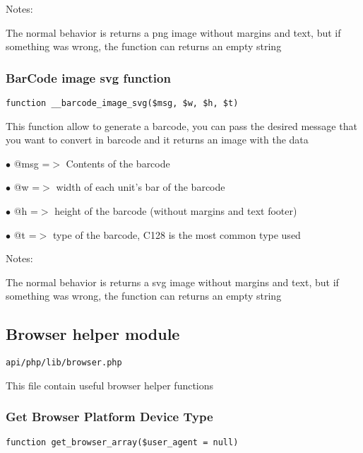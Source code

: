 \documentclass[a4paper]{article}
\begin{document}
Notes:

The normal behavior is returns a png image without margins and text,
but if something was wrong, the function can returns an empty string

\hypertarget{toc388}{}
\subsubsection{BarCode image svg function}

\begin{lstlisting}
function __barcode_image_svg($msg, $w, $h, $t)
\end{lstlisting}

This function allow to generate a barcode, you can pass the desired
message that you want to convert in barcode and it returns an image
with the data

\begin{compactitem}
\item[\color{myblue}$\bullet$] @msg =$>$ Contents of the barcode
\item[\color{myblue}$\bullet$] @w   =$>$ width of each unit's bar of the barcode
\item[\color{myblue}$\bullet$] @h   =$>$ height of the barcode (without margins and text footer)
\item[\color{myblue}$\bullet$] @t   =$>$ type of the barcode, C128 is the most common type used
\end{compactitem}

Notes:

The normal behavior is returns a svg image without margins and text,
but if something was wrong, the function can returns an empty string

\hypertarget{toc389}{}
\subsection{Browser helper module}

\begin{lstlisting}
api/php/lib/browser.php
\end{lstlisting}

This file contain useful browser helper functions

\hypertarget{toc390}{}
\subsubsection{Get Browser Platform Device Type}

\begin{lstlisting}
function get_browser_array($user_agent = null)
\end{lstlisting}
\end{document}
